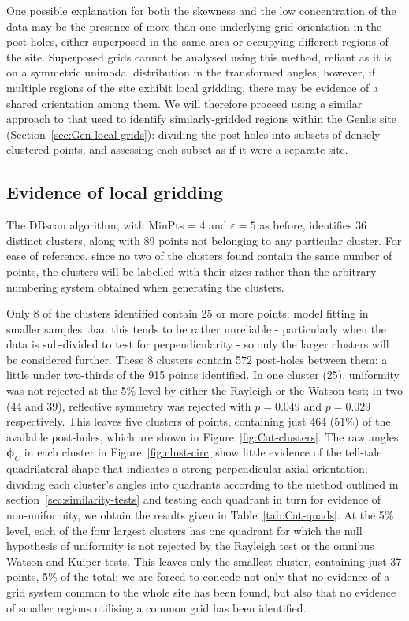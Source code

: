 \documentclass[../../ArchStats.tex]{subfiles}
\begin{document}
One possible explanation for both the skewness and the low concentration of the data may be the presence of more than one underlying grid orientation in the post-holes, either superposed in the same area or occupying different regions of the site. Superposed grids cannot be analysed using this method, reliant as it is on a symmetric unimodal distribution in the transformed angles; however, if multiple regions of the site exhibit local gridding, there may be evidence of a shared orientation among them.  We will therefore proceed using a similar approach to that used to identify similarly-gridded regions within the Genlis site (Section~\ref{sec:Gen-local-grids}): dividing the post-holes into subsets of densely-clustered points, and assessing each subset as if it were a separate site.


\subsection{Evidence of local gridding}
The DBscan algorithm, with MinPts = 4 and $\varepsilon = 5$ as before, identifies 36 distinct clusters, along with 89 points not belonging to any particular cluster. For ease of reference, since no two of the clusters  found  contain the same number of points, the clusters will be labelled with their sizes rather than the arbitrary numbering system obtained when generating the clusters.


Only 8 of the clusters identified contain 25 or more points: model fitting in smaller samples than this tends to be rather unreliable - particularly when the data is sub-divided to test for perpendicularity - so only the larger clusters will be considered further. These 8 clusters contain 572 post-holes between them: a little under two-thirds of the 915 points identified. In one cluster (25), uniformity was not rejected at the 5\% level by either the Rayleigh or the Watson test; in two (44 and 39), reflective symmetry was rejected with $p = 0.049$ and $p=0.029$ respectively. This leaves five clusters of points, containing just 464 (51\%) of the available post-holes, which are shown in Figure~\ref{fig:Cat-clusters}. The raw angles $\boldsymbol{\phi}_C$ in each cluster in Figure~\ref{fig:clust-circ} show little evidence of the tell-tale quadrilateral shape that indicates a strong perpendicular axial orientation; dividing each cluster's angles into quadrants according to the method outlined in section~\ref{sec:similarity-tests} and testing each quadrant in turn for evidence of non-uniformity, we obtain the results given in Table~\ref{tab:Cat-quads}. At the 5\% level, each of the four largest clusters has one quadrant for which the null hypothesis of uniformity is not rejected by the Rayleigh test or the omnibus Watson and Kuiper tests. This leaves only the smallest cluster, containing just 37 points, 5\% of the total; we are forced to concede not only that no evidence of a grid system common to the whole site has been found, but also that no evidence of smaller regions utilising a common grid has been identified.
\end{document}
